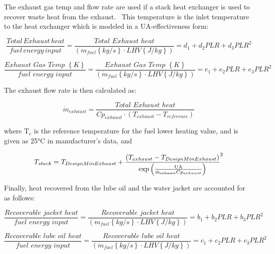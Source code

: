 The exhaust gas temp and flow rate are used if a stack heat exchanger is used to recover waste heat from the exhaust.~ This temperature is the inlet temperature to the heat exchanger which is modeled in a UA-effectiveness form:

\begin{equation}
\frac{{Total\,Exhaust\,heat}}{{fuel\,energy\,input}} = \frac{{Total\,\,Exhaust\,\,heat}}{{\left( {{{\dot m}_{fuel}}\left\{ {kg/s} \right\} \cdot LHV\left\{ {J/kg} \right\}} \right)}} = {d_1} + {d_2}PLR + {d_3}PL{R^2}
\end{equation}

\begin{equation}
\frac{{Exhaust\,\,Gas\,\,Temp\,\,\left\{ K \right\}}}{{fuel\,\,energy\,\,input}} = \frac{{Exhaust\,\,Gas\,\,Temp\,\,\left\{ K \right\}}}{{\left( {{{\dot m}_{fuel}}\left\{ {kg/s} \right\} \cdot LHV\left\{ {J/kg} \right\}} \right)}} = {e_1} + {e_2}PLR + {e_3}PL{R^2}
\end{equation}

The exhaust flow rate is then calculated as:

\begin{equation}
{\dot m_{exhaust}} = \frac{{Total\,\,Exhaust\,\,heat}}{{C{p_{exhaust}} \cdot \left( {{T_{exhaust}} - {T_{reference}}} \right)}}
\end{equation}

where T\(_{e}\) is the reference temperature for the fuel lower heating value, and is given as 25°C in manufacturer's data, and

\begin{equation}
{T_{stack}} = {T_{DesignMinExhaust}} + {\frac{{\left( {{T_{exhaust}} - {T_{DesignMinExhaust}}} \right)}}{{{\rm{exp}}\left( {\frac{{{\rm{UA}}}}{{{{{\rm{\dot m}}}_{{\rm{exhaust}}}}C{p_{exhaust}}}}} \right)}}^2}
\end{equation}

Finally, heat recovered from the lube oil and the water jacket are accounted for as follows:

\begin{equation}
\frac{{Recoverable\,\,jacket\,\,heat}}{{fuel\,\,energy\,\,input}} = \frac{{Recoverable\,\,jacket\,\,heat}}{{\left( {{{\dot m}_{fuel}}\left\{ {kg/s} \right\} \cdot LHV\left\{ {J/kg} \right\}} \right)}} = {b_1} + {b_2}PLR + {b_3}PL{R^2}
\end{equation}

\begin{equation}
\frac{{Recoverable\,\,lube\,\,oil\,\,heat}}{{fuel\,\,energy\,\,input}} = \frac{{Recoverable\,\,lube\,\,oil\,\,heat}}{{\left( {{{\dot m}_{fuel}}\left\{ {kg/s} \right\} \cdot LHV\left\{ {J/kg} \right\}} \right)}} = {c_1} + {c_2}PLR + {c_3}PL{R^2}
\end{equation}

